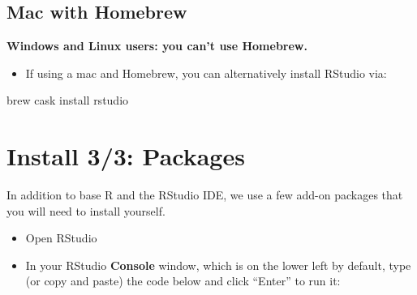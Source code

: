 \documentclass[
  letterpaper,
  DIV=11,
  numbers=noendperiod]{scrreprt}
\newenvironment{Shaded}{\begin{snugshade}}{\end{snugshade}}
\newcommand{\NormalTok}[1]{\textcolor[rgb]{0.00,0.23,0.31}{#1}}
\providecommand{\tightlist}{%
  \setlength{\itemsep}{0pt}\setlength{\parskip}{0pt}}\usepackage{longtable,booktabs,array}
\theoremstyle{remark}
\begin{document}
\subsection{Mac with Homebrew}\label{mac-with-homebrew-1}

\textbf{Windows and Linux users: you can't use Homebrew.}

\begin{itemize}
\tightlist
\item
  If using a mac and Homebrew, you can alternatively install RStudio
  via:
\end{itemize}

\begin{Shaded}
\begin{Highlighting}[]
\NormalTok{brew cask install rstudio}
\end{Highlighting}
\end{Shaded}

\section{Install 3/3: Packages}\label{install-33-packages}

In addition to base R and the RStudio IDE, we use a few add-on packages
that you will need to install yourself.

\begin{itemize}
\tightlist
\item
  Open RStudio
\item
  In your RStudio \textbf{Console} window, which is on the lower left by
  default, type (or copy and paste) the code below and click ``Enter''
  to run it:
\end{itemize}
\end{document}

